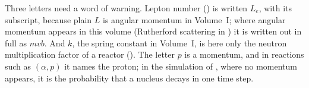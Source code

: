 Three letters need a word of warning. Lepton number () is written $L_e$, with its
subscript, because plain $L$ is angular momentum in Volume~I; where angular momentum appears in this
volume (Rutherford scattering in ) it is written out in full as $mvb$. And $k$, the spring constant in
Volume~I, is here only the neutron multiplication factor of a reactor (). The letter
$p$ is a momentum, and in reactions such as $(\alpha,p)$ it names the proton; in the simulation of
, where no momentum appears, it is the probability that a nucleus decays in one time
step.
